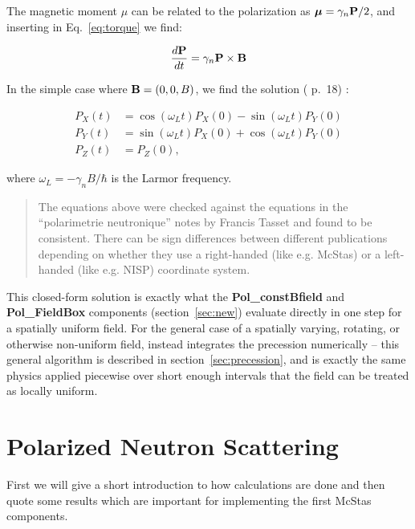 The magnetic moment $\mu$ can be related to the polarization as $\boldsymbol{\mu}
= \gamma_n \mathbf{P}/2$, and inserting in Eq.~\ref{eq:torque} we find:

\begin{equation}
  \label{eq:pol_magnetic}
  \frac{d\mathbf{P}}{dt} = \gamma_n \mathbf{P} \times \mathbf{B}
\end{equation}

In the simple case where $\mathbf{B} = (0, 0, B)$, we find the solution
(\cite{gavin} p.~18) :

\begin{equation}
  \label{eq:precession}
  \begin{aligned}
  P_X(t) &=  \cos(\omega_L t) P_X(0) - \sin(\omega_L t) P_Y(0)  \\
  P_Y(t) &=  \sin(\omega_L t) P_X(0) + \cos(\omega_L t) P_Y(0)  \\
  P_Z(t) &=  P_Z(0),
  \end{aligned}
\end{equation}

where $\omega_L = -\gamma_n B/\hbar$ is the Larmor frequency.\\

\begin{quote}
  The equations above were checked against the equations in the ``polarimetrie
  neutronique'' notes by Francis Tasset and found to be consistent. There can
  be sign differences between different publications depending on whether they
  use a right-handed (like e.g. McStas) or a left-handed (like e.g. NISP)
  coordinate system.
\end{quote}

This closed-form solution is exactly what the \textbf{Pol\_constBfield} and
\textbf{Pol\_FieldBox} components (section~\ref{sec:new}) evaluate directly
in one step for a spatially uniform field. For the general case of a
spatially varying, rotating, or otherwise non-uniform field, \MCS instead
integrates the precession numerically -- this general algorithm is
described in section~\ref{sec:precession}, and is exactly the same physics
applied piecewise over short enough intervals that the field can be treated
as locally uniform.

\section{Polarized Neutron Scattering}
\label{sec:scat}

First we will give a short introduction to how calculations are done
and then quote some results which are important for implementing the
first McStas components.

